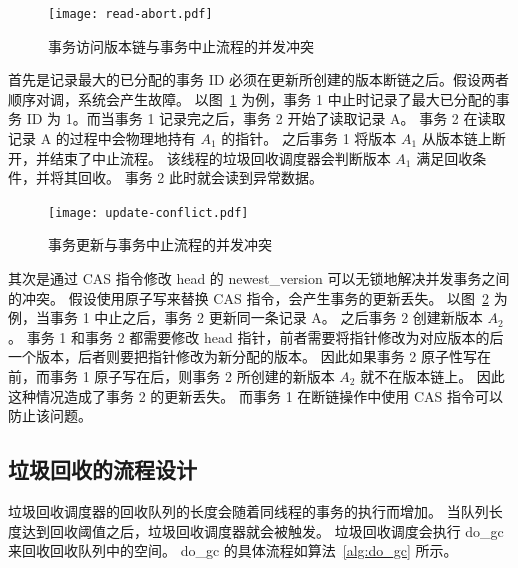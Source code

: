 \begin{figure}
    \centering
    \texttt{[image: read-abort.pdf]}
    \caption{事务访问版本链与事务中止流程的并发冲突}
    \label{fig:update-abort-read}
\end{figure}

首先是记录最大的已分配的事务 ID 必须在更新所创建的版本断链之后。假设两者顺序对调，系统会产生故障。
以图~\ref{fig:update-abort-read} 为例，事务 1 中止时记录了最大已分配的事务 ID 为 1。而当事务 1 记录完之后，事务 2 开始了读取记录 A。
事务 2 在读取记录 A 的过程中会物理地持有 $A_1$ 的指针。
之后事务 1 将版本 $A_1$ 从版本链上断开，并结束了中止流程。
该线程的垃圾回收调度器会判断版本 $A_1$ 满足回收条件，并将其回收。
事务 2 此时就会读到异常数据。

\begin{figure}
    \centering
    \texttt{[image: update-conflict.pdf]}
    \caption{事务更新与事务中止流程的并发冲突}
    \label{fig:update-abort-update}
\end{figure}

其次是通过 CAS 指令修改 head 的 newest\_version 可以无锁地解决并发事务之间的冲突。
假设使用原子写来替换 CAS 指令，会产生事务的更新丢失。
以图~\ref{fig:update-abort-update} 为例，当事务 1 中止之后，事务 2 更新同一条记录 A。
之后事务 2 创建新版本 $A_2$。
事务 1 和事务 2 都需要修改 head 指针，前者需要将指针修改为对应版本的后一个版本，后者则要把指针修改为新分配的版本。
因此如果事务 2 原子性写在前，而事务 1 原子写在后，则事务 2 所创建的新版本 $A_2$ 就不在版本链上。
因此这种情况造成了事务 2 的更新丢失。
而事务 1 在断链操作中使用 CAS 指令可以防止该问题。





\subsection{垃圾回收的流程设计}
\label{ssec:gc-implement}

垃圾回收调度器的回收队列的长度会随着同线程的事务的执行而增加。
当队列长度达到回收阈值之后，垃圾回收调度器就会被触发。
垃圾回收调度会执行 do\_gc 来回收回收队列中的空间。
do\_gc 的具体流程如算法~\ref{alg:do_gc} 所示。

